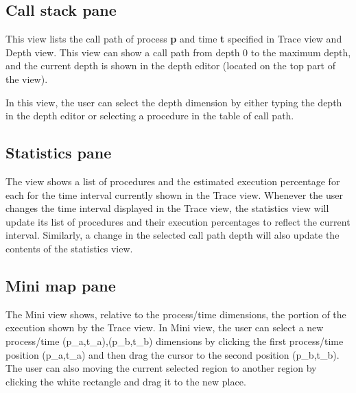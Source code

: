 \documentclass[english]{article}
\begin{document}
\subsection{Call stack pane}

This view lists the call path of process \textbf{p} and time \textbf{t} specified in Trace view and Depth view.
This view can show a call path from depth $0$ to the maximum depth, and the current depth is shown in the depth editor (located on the top part of the view).

In this view, the user can select the depth dimension by either typing the depth in the depth editor or selecting a procedure in the table of call path.


\subsection{Statistics pane}

The view shows a list of procedures and the estimated execution percentage for each for the time interval currently shown in the Trace view.
  Whenever the user changes the time interval displayed in the Trace view, the statistics view will update its list of procedures and their execution percentages to
  reflect the current interval.  Similarly, a change in the selected call path depth will also update the contents of the statistics view.


\subsection{Mini map pane}

The Mini view shows, relative to the process/time dimensions, the portion of the execution shown by the Trace view.
In Mini view, the user can select a new process/time (p_a,t_a),(p_b,t_b) dimensions by clicking the first process/time position (p_a,t_a) and then drag the cursor to the second position (p_b,t_b).
The user can also moving the current selected region to another region by clicking the white rectangle and drag it to the new place.




\end{document}
